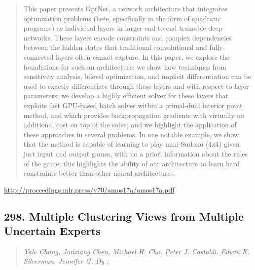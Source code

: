 \documentclass{article}
\begin{document}
\begin{quote}
    This paper presents OptNet, a network architecture that integrates optimization problems (here, specifically in the form of quadratic programs) as individual layers in larger end-to-end trainable deep networks. These layers encode constraints and complex dependencies between the hidden states that traditional convolutional and fully-connected layers often cannot capture. In this paper, we explore the foundations for such an architecture: we show how techniques from sensitivity analysis, bilevel optimization, and implicit differentiation can be used to exactly differentiate through these layers and with respect to layer parameters; we develop a highly efficient solver for these layers that exploits fast GPU-based batch solves within a primal-dual interior point method, and which provides backpropagation gradients with virtually no additional cost on top of the solve; and we highlight the application of these approaches in several problems. In one notable example, we show that the method is capable of learning to play mini-Sudoku (4x4) given just input and output games, with no a priori information about the rules of the game; this highlights the ability of our architecture to learn hard constraints better than other neural architectures.  
\end{quote}

\href{http://proceedings.mlr.press/v70/amos17a/amos17a.pdf}{http://proceedings.mlr.press/v70/amos17a/amos17a.pdf}

\subsection{298. Multiple Clustering Views from Multiple Uncertain Experts}

\begin{quote}
\footnotesize{\textit{Yale Chang, Junxiang Chen, Michael H. Cho, Peter J. Castaldi, Edwin K. Silverman, Jennifer G. Dy ;}}

\end{quote}
\end{document}
